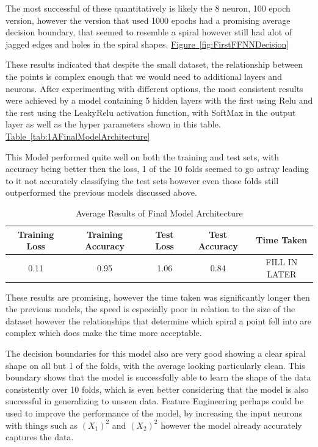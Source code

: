 \documentclass[runningheads]{llncs}
\begin{document}
The most successful of these quantitatively is likely the 8 neuron, 100 epoch version, however the version that used 1000 epochs had a promising average decision boundary, that seemed to resemble a spiral however still had alot of jagged edges and holes in the spiral shapes. \hyperref[fig:FirstFFNNDecision]{Figure~\ref*{fig:FirstFFNNDecision}}


\FloatBarrier

These results indicated that despite the small dataset, the relationship between the points is complex enough that we would need to additional layers and neurons. After experimenting with different options, the most consistent results were achieved by a model containing 5 hidden layers with the first using Relu and the rest using the LeakyRelu activation function, with SoftMax in the output layer as well as the hyper parameters shown in this table. \hyperref[tab:1AFinalModelArchitecture]{Table~\ref*{tab:1AFinalModelArchitecture}}

This Model performed quite well on both the training and test sets, with accuracy being better then the loss, 1 of the 10 folds seemed to go astray leading to it  not accurately classifying the test sets however even those folds still outperformed the previous models discussed above.

\begin{table}[ht]
  \centering
  \caption{Average Results of Final Model Architecture}
  \begin{tabular}{c c c c c}
    \toprule
     Training Loss \quad & Training Accuracy \quad & Test Loss \quad & Test Accuracy \quad & Time Taken\\
    \midrule
    0.11 & 0.95  & 1.06 & 0.84 & FILL IN LATER \\
    \bottomrule
  \end{tabular}
  \label{tab:1AFinalModelAverageResults}
\end{table}


These results are promising, however the time taken was significantly longer then the previous models, the speed is especially poor in relation to the size of the dataset however the relationships that determine which spiral a point fell into are complex which does make the time more acceptable.

The decision boundaries for this model also are very good showing a clear spiral shape on all but 1 of the folds, with the average looking particularly clean. This boundary shows that the model is successfully able to learn the shape of the data consistently over 10 folds, which is even better considering that the model is also successful in generalizing to unseen data. Feature Engineering perhaps could be used to improve the performance of the model, by increasing the input neurons with things such as $(X_{1})^{2}$ and $(X _ {2})^{2}$ however the model already accurately captures the data.
 
\end{document}
